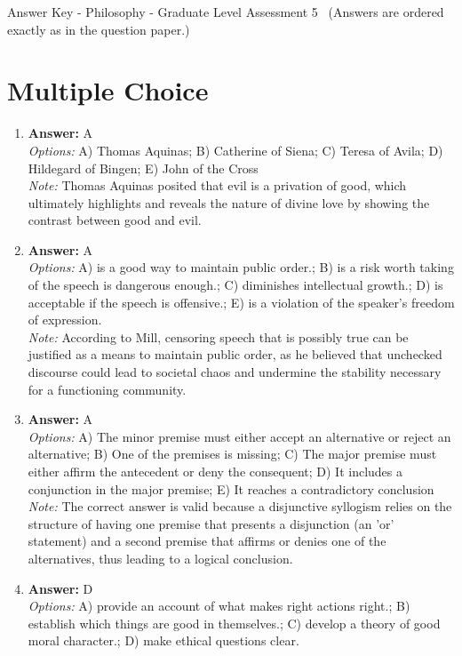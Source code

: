 \documentclass[12pt]{article}
\begin{document}
\begin{center}
Answer Key - Philosophy - Graduate Level Assessment 5 \
\small (Answers are ordered exactly as in the question paper.)
\end{center}

\section*{Multiple Choice}
\begin{enumerate}[label=\arabic*.]
\item \textbf{Answer:} A
\\ \textit{Options:} A) Thomas Aquinas; B) Catherine of Siena; C) Teresa of Avila; D) Hildegard of Bingen; E) John of the Cross
\\ \textit{Note:} Thomas Aquinas posited that evil is a privation of good, which ultimately highlights and reveals the nature of divine love by showing the contrast between good and evil.
\item \textbf{Answer:} A
\\ \textit{Options:} A) is a good way to maintain public order.; B) is a risk worth taking of the speech is dangerous enough.; C) diminishes intellectual growth.; D) is acceptable if the speech is offensive.; E) is a violation of the speaker's freedom of expression.
\\ \textit{Note:} According to Mill, censoring speech that is possibly true can be justified as a means to maintain public order, as he believed that unchecked discourse could lead to societal chaos and undermine the stability necessary for a functioning community.
\item \textbf{Answer:} A
\\ \textit{Options:} A) The minor premise must either accept an alternative or reject an alternative; B) One of the premises is missing; C) The major premise must either affirm the antecedent or deny the consequent; D) It includes a conjunction in the major premise; E) It reaches a contradictory conclusion
\\ \textit{Note:} The correct answer is valid because a disjunctive syllogism relies on the structure of having one premise that presents a disjunction (an 'or' statement) and a second premise that affirms or denies one of the alternatives, thus leading to a logical conclusion.
\item \textbf{Answer:} D
\\ \textit{Options:} A) provide an account of what makes right actions right.; B) establish which things are good in themselves.; C) develop a theory of good moral character.; D) make ethical questions clear.

\end{enumerate}
\end{document}
